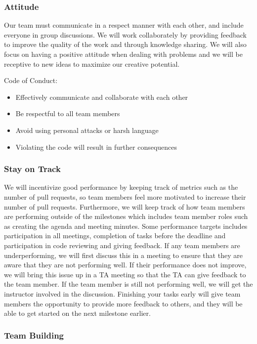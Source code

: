 \documentclass{article}
\begin{document}
\subsubsection*{Attitude}

Our team must communicate in a respect manner with each other, and include everyone in group discussions. We will work collaborately by providing feedback to improve the quality of the work and through 
knowledge sharing. We will also focus on having a positive attitude when dealing with problems and we will be receptive to new ideas to maximize our creative potential.


Code of Conduct: 
\begin{itemize}
    \item Effectively communicate and collaborate with each other
    \item Be respectful to all team members
    \item Avoid using personal attacks or harsh language
    \item Violating the code will result in further consequences
\end{itemize}

\subsubsection*{Stay on Track}

We will incentivize good performance by keeping track of metrics such as the number of pull requests, so team members feel more motivated to increase their number of pull requests. Furthermore, we will 
keep track of how team members are performing outside of the milestones which includes team member roles such as creating the agenda and meeting minutes. Some performance targets includes participation 
in all meetings, completion of tasks before the deadline and participation in code reviewing and giving feedback. If any team members are underperforming, we will first discuss this in a meeting to 
ensure that they are aware that they are not performing well. If their performance does not improve, we will bring this issue up in a TA meeting so that the TA can give feedback to the team member. 
If the team member is still not performing well, we will get the instructor involved in the discussion. Finishing your tasks early will give team members the opportunity to provide more feedback to 
others, and they will be able to get started on the next milestone earlier.

\subsubsection*{Team Building}
\end{document}
